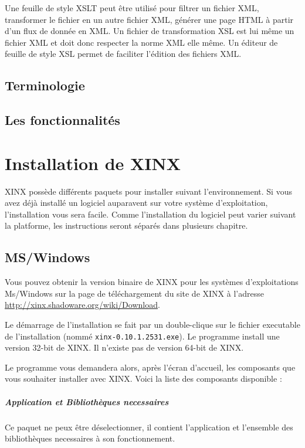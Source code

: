 \documentclass[a4paper,10pt,twoside]{book}
\begin{document}
Une feuille de style XSLT peut être utilisé pour filtrer un fichier XML, transformer le fichier en un autre fichier XML, générer une page HTML à partir d'un flux de donnée en XML. Un fichier de transformation XSL est lui même un fichier XML et doit donc respecter la norme XML elle même. Un éditeur de feuille de style XSL permet de faciliter l'édition des fichiers XML.

\section{Terminologie}

\section{Les fonctionnalités}

\chapter{Installation de XINX}

XINX possède différents paquets pour installer suivant l'environnement. Si vous avez déjà installé un logiciel auparavent sur votre système d'exploitation, l'installation vous sera facile. Comme l'installation du logiciel peut varier suivant la platforme, les instructions seront séparés dans plusieurs chapitre.

\section{MS/Windows}

Vous pouvez obtenir la version binaire de XINX pour les systèmes d'exploitations Ms/Windows sur la page de téléchargement du site de XINX à l'adresse \url{http://xinx.shadoware.org/wiki/Download}. 

Le démarrage de l'installation se fait par un double-clique sur le fichier executable de l'installation (nommé \verb+xinx-0.10.1.2531.exe+). Le programme install une version 32-bit de XINX. Il n'existe pas de version 64-bit de XINX.

Le programme vous demandera alors, après l'écran d'accueil, les composants que vous souhaiter installer avec XINX. Voici la liste des composants disponible :

\paragraph{Application et Bibliothèques necessaires} Ce paquet ne peux être déselectionner, il contient l'application et l'ensemble des bibliothèques necessaires à son fonctionnement.
\end{document}
